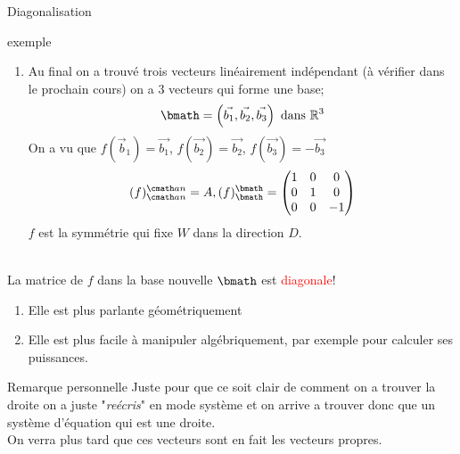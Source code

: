 \begin{parag}{Diagonalisation}
\begin{subparag}{exemple}
\begin{enumerate}
    \item Au final on a trouvé trois vecteurs linéairement indépendant (à vérifier dans le prochain cours) on a $3$ vecteurs qui forme une base;
    \[\bmath = \left(\vec{b_1}, \vec{b_2}, \vec{b_3} \right) \text{ dans } \mathbb{R}^3\]
    On a vu que $f(\vec{b}_1) = \vec{b_1}$, $f(\vec{b_2})= \vec{b_2}$, $f(\vec{b_3}) = -\vec{b_3}$\\
    \[(f)_{\cmath an}^{\cmath an} = A, (f)_\bmath^\bmath = \begin{pmatrix}
        1 & 0 & 0 \\
        0 & 1 & 0 \\
        0 & 0 & -1
    \end{pmatrix}\]
    $f$ est la symmétrie qui fixe $W$ dans la direction $D$.
    \end{enumerate}
    \\
    La matrice de $f$ dans la base nouvelle $\bmath$ est \textcolor{red}{diagonale}!
    \begin{enumerate}
        \item Elle est plus parlante géométriquement
        \item Elle est plus facile à manipuler algébriquement, par exemple  pour calculer ses puissances.
    \end{enumerate}
    \end{subparag}
    \begin{subparag}{Remarque personnelle}
        Juste pour que ce soit clair de comment on a trouver la droite on a juste "\textit{reécris}" en mode système et on arrive a trouver donc que un système d'équation qui est une droite.\\
        On verra plus tard que ces vecteurs sont en fait les vecteurs propres.
    \end{subparag}
\end{parag}



